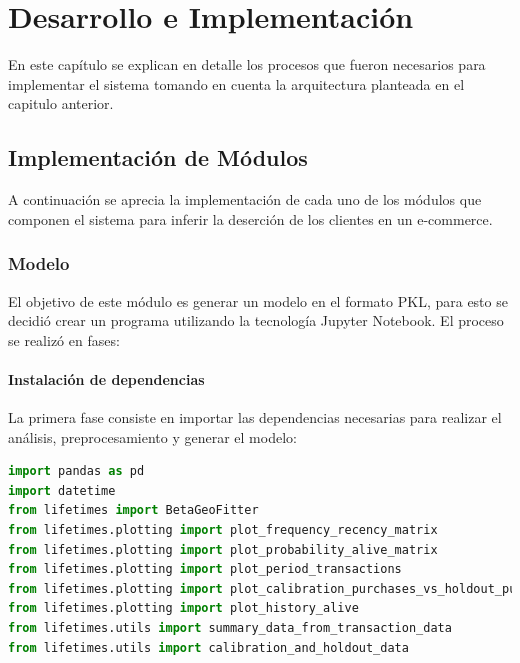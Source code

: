 
\chapter{Desarrollo e Implementación}

En este capítulo se explican en detalle los procesos que fueron necesarios para implementar el sistema tomando en cuenta la arquitectura planteada en el capitulo anterior. 

\section{Implementación de Módulos}

	A continuación se aprecia la implementación de cada uno de los módulos que componen el sistema para inferir la deserción de los clientes en un e-commerce.
	
\subsection{Modelo}

El objetivo de este módulo es generar un modelo en el formato PKL, para esto se decidió crear un programa utilizando la tecnología Jupyter Notebook. El proceso se realizó en fases:

\subsubsection{Instalación de dependencias}

La primera fase consiste en importar las dependencias necesarias para realizar el análisis, preprocesamiento y generar el modelo:

\begin{lstlisting}[language=Python, caption=Importar dependencias en modelo.ipynb]
import pandas as pd
import datetime
from lifetimes import BetaGeoFitter
from lifetimes.plotting import plot_frequency_recency_matrix
from lifetimes.plotting import plot_probability_alive_matrix
from lifetimes.plotting import plot_period_transactions
from lifetimes.plotting import plot_calibration_purchases_vs_holdout_purchases
from lifetimes.plotting import plot_history_alive
from lifetimes.utils import summary_data_from_transaction_data
from lifetimes.utils import calibration_and_holdout_data
\end{lstlisting}

